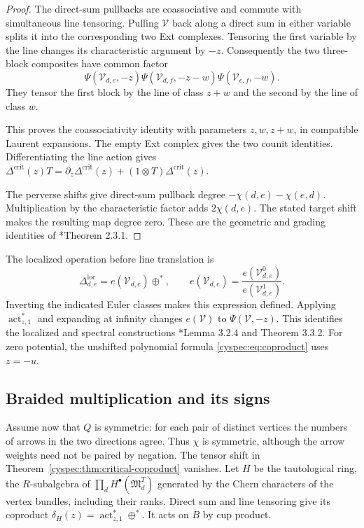\begin{proof}
The direct-sum pullbacks are coassociative and commute with
simultaneous line tensoring. Pulling $\mathcal V$ back along a
direct sum in either variable splits it into the corresponding
two Ext complexes. Tensoring the first variable by the line changes
its characteristic argument by $-z$.
Consequently the two three-block composites have common factor
\[
 \Psi(\mathcal V_{d,e},-z)
 \Psi(\mathcal V_{d,f},-z-w)
 \Psi(\mathcal V_{e,f},-w).
\]
They tensor the first block by the line of class $z+w$
and the second by the line of class $w$.

This proves the coassociativity identity with parameters $z,w,z+w$,
in compatible Laurent expansions. The empty Ext complex gives the
two counit identities. Differentiating the line action gives
$\Delta^{\mathrm{crit}}(z)T=\partial_z\Delta^{\mathrm{crit}}(z)
+(1\otimes T)\Delta^{\mathrm{crit}}(z)$.

The perverse shifts give direct-sum pullback degree
$-\chi(d,e)-\chi(e,d)$. Multiplication by the characteristic factor
adds $2\chi(d,e)$. The stated target shift makes the resulting map
degree zero. These are the geometric and grading identities of
\cite{cyspec:JKL}*{Theorem 2.3.1}.
\end{proof}

The localized operation before line translation is
\[
 \Delta^{\mathrm{loc}}_{d,e}
 =e(\mathcal V_{d,e})\oplus^*,\qquad
 e(\mathcal V_{d,e})=
 \frac{e(\mathcal V_{d,e}^0)}{e(\mathcal V_{d,e}^1)}.
\]
Inverting the indicated Euler classes makes this expression defined.
Applying $\operatorname{act}_{z,1}^*$ and expanding at infinity
changes $e(\mathcal V)$ to $\Psi(\mathcal V,-z)$.
This identifies the localized and spectral constructions
\cite{cyspec:JKL}*{Lemma 3.2.4 and Theorem 3.3.2}.
For zero potential, the unshifted polynomial formula
\eqref{cyspec:eq:coproduct} uses $z=-u$.

\subsection{Braided multiplication and its signs}

Assume now that $Q$ is symmetric: for each pair of distinct vertices
the numbers of arrows in the two directions agree. Thus $\chi$ is
symmetric, although the arrow weights need not be paired by negation.
The tensor shift in Theorem~\ref{cyspec:thm:critical-coproduct} vanishes.
Let $H$ be the tautological ring, the $R$-subalgebra of
$\prod_d H^\bullet(\mathfrak M_d^T)$ generated by the Chern characters
of the vertex bundles, including their ranks.
Direct sum and line tensoring give its coproduct
$\delta_H(z)=\operatorname{act}_{z,1}^*\oplus^*$.
It acts on $B$ by cup product.

